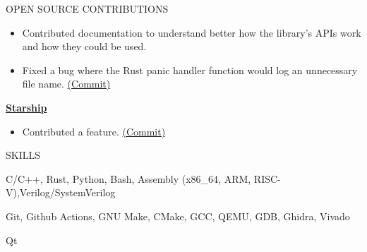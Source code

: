 \documentclass{resume} %
\begin{document}
\begin{rSection}{OPEN SOURCE CONTRIBUTIONS}
\begin{itemize}
		\itemsep -8pt{}	\item Contributed documentation to understand better how the library's APIs work and how they could be used.
		\item Fixed a bug where the Rust panic handler function would log an unnecessary file name. \href{https://github.com/rust-osdev/uefi-rs/commit/5939e57f6786e60e9caf57f5aa0aa53b8bc3d83b}{(Commit)}
	\end{itemize}
	\vspace{-.75em}
	\item \href{https://github.com/starship/starship}{\textbf{Starship}}
	\vspace{-.75em}
	\begin{itemize}
		\itemsep -8pt{}
		\item Contributed a feature. \href{https://github.com/starship/starship/commit/4deaa02d6fb3e72f286d822ac4c987b763c415dc}{(Commit)}
	\end{itemize}
	
	
\end{rSection}


\vspace{-.75em}
\begin{rSection}{SKILLS}
\begin{description}
	\itemsep -8pt{}
	\item[Programming Languages] C/C++, Rust, Python, Bash, Assembly (x86\_64, ARM, RISC-V),Verilog/SystemVerilog
	\item[Development Tools] Git, Github Actions, GNU Make, CMake, GCC, QEMU, GDB, Ghidra, Vivado
	\item[Frameworks] Qt
\end{description}
\end{rSection}

\end{document}

